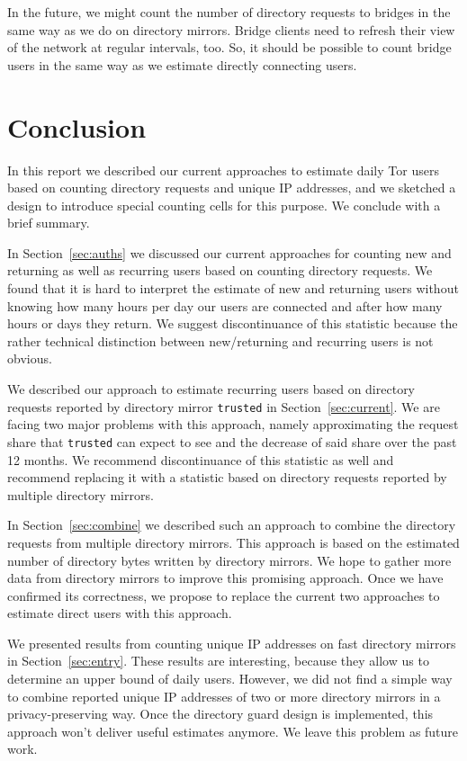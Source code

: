 \documentclass{article}
\begin{document}
In the future, we might count the number of directory requests to bridges
in the same way as we do on directory mirrors.
Bridge clients need to refresh their view of the network at regular
intervals, too.
So, it should be possible to count bridge users in the same way as we
estimate directly connecting users.

\section{Conclusion}
\label{sec:conclusion}

In this report we described our current approaches to estimate daily Tor
users based on counting directory requests and unique IP addresses, and we
sketched a design to introduce special counting cells for this purpose.
We conclude with a brief summary.

In Section~\ref{sec:auths} we discussed our current approaches for
counting new and returning as well as recurring users based on counting
directory requests.
We found that it is hard to interpret the estimate of new and returning
users without knowing how many hours per day our users are connected and
after how many hours or days they return.
We suggest discontinuance of this statistic because the rather
technical distinction between new/returning and recurring users is not
obvious.

We described our approach to estimate recurring users based on directory
requests reported by directory mirror \texttt{trusted} in
Section~\ref{sec:current}.
We are facing two major problems with this approach, namely approximating
the request share that \texttt{trusted} can expect to see and the decrease
of said share over the past 12 months.
We recommend discontinuance of this statistic as well and recommend replacing it with a
statistic based on directory requests reported by multiple directory
mirrors.

In Section~\ref{sec:combine} we described such an approach to combine the
directory requests from multiple directory mirrors.
This approach is based on the estimated number of directory bytes written
by directory mirrors.
We hope to gather more data from directory mirrors to improve this
promising approach.
Once we have confirmed its correctness, we propose to replace the current
two approaches to estimate direct users with this approach.

We presented results from counting unique IP addresses on fast directory
mirrors in Section~\ref{sec:entry}.
These results are interesting, because they allow us to determine an upper
bound of daily users.
However, we did not find a simple way to combine reported unique IP
addresses of two or more directory mirrors in a privacy-preserving way.
Once the directory guard design is implemented, this approach won't
deliver useful estimates anymore.
We leave this problem as future work.
\end{document}
